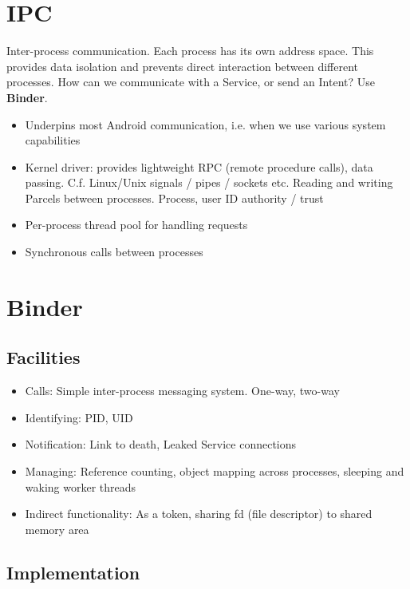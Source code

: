 \documentclass{article}
\begin{document}
\tableofcontents

\newpage

\section{IPC}
Inter-process communication. Each process has its own address space. This provides data isolation and prevents direct interaction between different processes. How can we communicate with a Service, or send an Intent? Use \textbf{Binder}.
\begin{itemize}
  \item Underpins most Android communication, i.e. when we use various system capabilities
  \item Kernel driver: provides lightweight RPC (remote procedure calls), data passing. C.f. Linux/Unix signals / pipes / sockets etc. Reading and writing Parcels between processes. Process, user ID authority / trust
  \item Per-process thread pool for handling requests
  \item Synchronous calls between processes
\end{itemize}

\section{Binder}

\subsection{Facilities}

\begin{itemize}
  \item Calls: Simple inter-process messaging system. One-way, two-way
  \item Identifying: PID, UID
  \item Notification: Link to death, Leaked Service connections
  \item Managing: Reference counting, object mapping across processes, sleeping and waking worker threads
  \item Indirect functionality: As a token, sharing fd (file descriptor) to shared memory area
\end{itemize}
\newpage

\subsection{Implementation}
\end{document}
